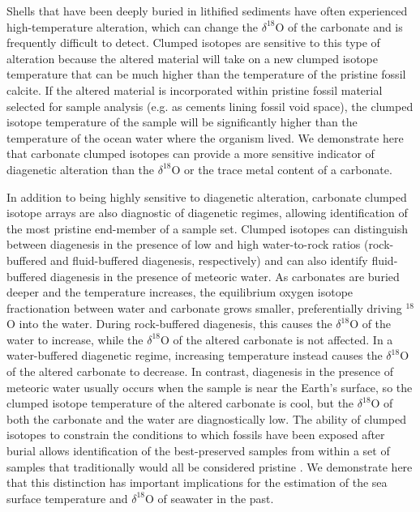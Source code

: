 \documentclass[5p, authoryear]{elsarticle}
\begin{document}
Shells that have been deeply buried in lithified sediments have often experienced high-temperature alteration, which can change the $\delta^{18}$O of the carbonate and is frequently difficult to detect. Clumped isotopes are sensitive to this type of alteration because the altered material will take on a new clumped isotope temperature that can be much higher than the temperature of the pristine fossil calcite. If the altered material is incorporated within pristine fossil material selected for sample analysis (e.g. as cements lining fossil void space), the clumped isotope temperature of the sample will be significantly higher than the temperature of the ocean water where the organism lived. We demonstrate here that carbonate clumped isotopes can provide a more sensitive indicator of diagenetic alteration than the $\delta^{18}$O or the trace metal content of a carbonate. 

In addition to being highly sensitive to diagenetic alteration, carbonate clumped isotope arrays are also diagnostic of diagenetic regimes, allowing identification of the most pristine end-member of a sample set. Clumped isotopes can distinguish between diagenesis in the presence of low and high water-to-rock ratios (rock-buffered and fluid-buffered diagenesis, respectively) and can also identify fluid-buffered diagenesis in the presence of meteoric water. As carbonates are buried deeper and the temperature increases, the equilibrium oxygen isotope fractionation between water and carbonate grows smaller, preferentially driving $^{18}$O into the water. During rock-buffered diagenesis, this causes the $\delta^{18}$O of the water to increase, while the $\delta^{18}$O of the altered carbonate is not affected. In a water-buffered diagenetic regime, increasing temperature instead causes the $\delta^{18}$O of the altered carbonate to decrease. In contrast, diagenesis in the presence of meteoric water usually occurs when the sample is near the Earth's surface, so the clumped isotope temperature of the altered carbonate is cool, but the $\delta^{18}$O of both the carbonate and the water are diagnostically low. The ability of clumped isotopes to constrain the conditions to which fossils have been exposed after burial allows identification of the best-preserved samples from within a set of samples that traditionally would all be considered pristine \citep{Eiler2011}. We demonstrate here that this distinction has important implications for the estimation of the sea surface temperature and $\delta^{18}$O of seawater in the past.  
\end{document}
